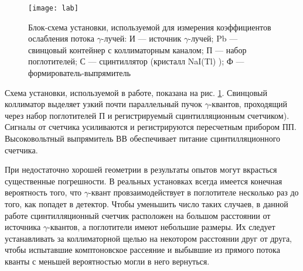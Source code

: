 \begin{figure}[h!]
  \centering
  \texttt{[image: lab]}
  \caption{Блок-схема установки, используемой для измерения коэффициентов
    ослабления потока $\gamma$-лучей: И --- источник $\gamma$-лучей; Pb ---
    свинцовый контейнер с коллиматорным каналом; П --- набор поглотителей; С ---
    сцинтиллятор (кристалл NaI(Tl) ); Ф --- формирователь-выпрямитель}
  \label{ris lab}
\end{figure}

Схема установки, используемой в работе, показана на рис. \ref{ris lab}.
Свинцовый коллиматор выделяет узкий почти параллельный пучок $\gamma$-квантов,
проходящий через набор поглотителей П и регистрируемый сцинтилляционным
счетчиком). Сигналы от счетчика усиливаются и регистрируются пересчетным
прибором ПП. Высоковольтный выпрямитель ВВ обеспечивает питание
сцинтилляционного счетчика.

При недостаточно хорошей геометрии в результаты опытов могут вкрасться
существенные погрешности. В реальных установках всегда имеется конечная
вероятность того, что $\gamma$-квант провзаимодействует в поглотителе несколько
раз до того, как попадет в детектор. Чтобы уменьшить число таких случаев, в
данной работе сцинтилляционный счетчик расположен на большом расстоянии от
источника $\gamma$-квантов, а поглотители имеют небольшие размеры. Их следует
устанавливать за коллиматорной щелью на некотором расстоянии друг от друга,
чтобы испытавшие комптоновское рассеяние и выбывшие из прямого потока кванты с
меньшей вероятностью могли в него вернуться.
